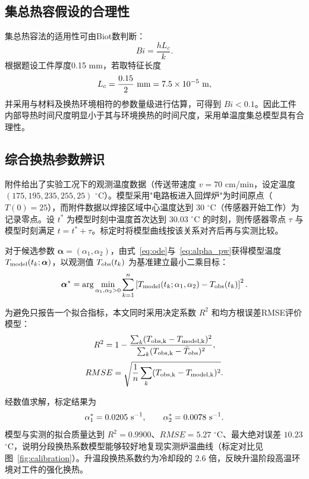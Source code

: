 \documentclass{cumcmthesis}
\begin{document}
\subsection{集总热容假设的合理性}

集总热容法的适用性可由Biot数判断：
\begin{equation}
Bi=\frac{hL_c}{k}.
\end{equation}
根据题设工件厚度0.15 mm，若取特征长度
\[
L_c=\frac{0.15}{2}\ {\rm mm}=7.5\times10^{-5}\ {\rm m},
\]
并采用与材料及换热环境相符的参数量级进行估算，可得到 $Bi<0.1$。因此工件内部导热时间尺度明显小于其与环境换热的时间尺度，采用单温度集总模型具有合理性。

\subsection{综合换热参数辨识}

附件给出了实验工况下的观测温度数据（传送带速度 $v=70$ cm/min，设定温度 $(175,195,235,255,25)$ $^\circ$C）。模型采用"电路板进入回焊炉"为时间原点（$T(0)=25$），而附件数据以焊接区域中心温度达到 $30$ $^\circ$C（传感器开始工作）为记录零点。设 $t^*$ 为模型时刻中温度首次达到 $30.03$ $^\circ$C 的时刻，则传感器零点 $\tau$ 与模型时刻满足 $t=t^*+\tau$。标定时将模型曲线按该关系对齐后再与实测比较。

对于候选参数 $\boldsymbol\alpha=(\alpha_1,\alpha_2)$，由式~\eqref{eq:ode}与~\eqref{eq:alpha_pw}获得模型温度 $T_{\rm model}(t_k;\boldsymbol\alpha)$，以观测值 $T_{\rm obs}(t_k)$ 为基准建立最小二乘目标：
\begin{equation}
\boldsymbol\alpha^*
=
\arg\min_{\alpha_1,\alpha_2>0}
\sum_{k=1}^{n}
\left[
T_{\rm model}(t_k;\alpha_1,\alpha_2)-T_{\rm obs}(t_k)
\right]^2.
\label{eq:alpha}
\end{equation}

为避免只报告一个拟合指标，本文同时采用决定系数 $R^2$ 和均方根误差RMSE评价模型：
\begin{equation}
R^2
=
1-
\frac{\sum_k(T_{\rm obs,k}-T_{\rm model,k})^2}
{\sum_k(T_{\rm obs,k}-\bar T_{\rm obs})^2},
\end{equation}
\begin{equation}
RMSE
=
\sqrt{
\frac{1}{n}
\sum_k
(T_{\rm obs,k}-T_{\rm model,k})^2
}.
\end{equation}

经数值求解，标定结果为
\[
\alpha_1^*=0.0205\ {\rm s}^{-1},\qquad
\alpha_2^*=0.0078\ {\rm s}^{-1}.
\]
模型与实测的拟合质量达到 $R^2=0.9900$、$RMSE=5.27$ $^\circ$C、最大绝对误差 $10.23$ $^\circ$C，说明分段换热系数模型能够较好地复现实测炉温曲线（标定对比见图~\ref{fig:calibration}）。升温段换热系数约为冷却段的 $2.6$ 倍，反映升温阶段高温环境对工件的强化换热。
\end{document}
